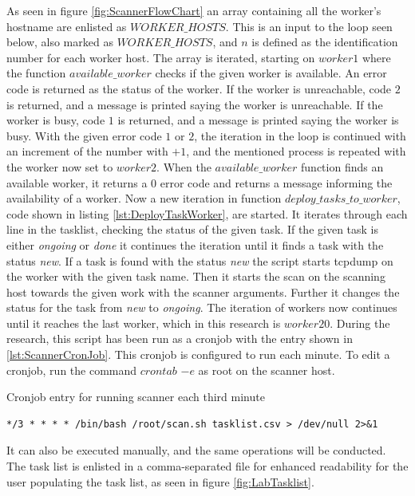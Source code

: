 As seen in figure \ref{fig:ScannerFlowChart} an array containing all the worker's hostname are enlisted as $WORKER\_HOSTS$.
This is an input to the loop seen below, also marked as $WORKER\_HOSTS$, and $n$ is defined as the identification number for each worker host.
The array is iterated, starting on $worker1$ where the function $available\_worker$ checks if the given worker is available.
An error code is returned as the status of the worker. If the worker is unreachable, code $2$ is returned, and a message is printed saying the worker is unreachable.
If the worker is busy, code $1$ is returned, and a message is printed saying the worker is busy.
With the given error code $1$ or $2$, the iteration in the loop is continued with an increment of the number with $+1$, and the mentioned process is repeated with the worker now set to $worker2$.
When the $available\_worker$ function finds an available worker, it returns a $0$ error code and returns a message informing the availability of a worker.
Now a new iteration in function $deploy\_tasks\_to\_worker$, code shown in listing \ref{lst:DeployTaskWorker}, are started.
It iterates through each line in the tasklist, checking the status of the given task. If the given task is either \textit{ongoing} or \textit{done} it continues the iteration until it finds a task with the status \textit{new}. If a task is found with the status \textit{new} the script starts tcpdump on the worker with the given task name. Then it starts the scan on the scanning host towards the given work with the scanner arguments. Further it changes the status for the task from \textit{new} to \textit{ongoing}.
The iteration of workers now continues until it reaches the last worker, which in this research is $worker20$.
During the research, this script has been run as a cronjob with the entry shown in \ref{lst:ScannerCronJob}.
This cronjob is configured to run each  minute. To edit a cronjob, run the command $crontab$ $-e$ as root on the scanner host.

\begin{listing}[!ht]
\caption{Cronjob entry for running scanner each third minute}
\label{lst:ScannerCronJob}
\begin{verbatim}
*/3 * * * * /bin/bash /root/scan.sh tasklist.csv > /dev/null 2>&1
\end{verbatim}
\end{listing}
It can also be executed manually, and the same operations will be conducted.
The task list is enlisted in a comma-separated file for enhanced readability for the user populating the task list, as seen in figure \ref{fig:LabTasklist}.

